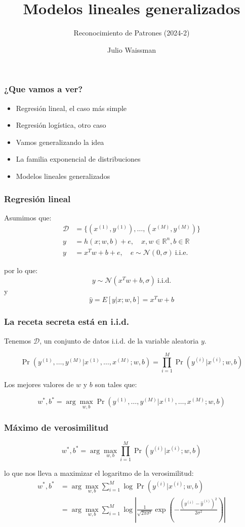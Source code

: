\documentclass{beamer}
\title{Modelos lineales generalizados}
\author{Reconocimiento de Patrones (2024-2)}
\date{Julio Waissman}
\begin{document}
\begin{frame}
  \titlepage
\end{frame}

\begin{frame}
  \frametitle{¿Que vamos a ver?}
  
\begin{itemize}
    \item  Regresión lineal, el caso más simple
    \item  Regresión logística, otro caso
    \item  Vamos generalizando la idea
    \item  La familia exponencial de distribuciones
    \item  Modelos lineales generalizados
\end{itemize}

\end{frame}

\begin{frame}
  \frametitle{Regresión lineal}

  Asumimos que:
  \begin{align*}
    \mathcal{D} &= \{(x^{(1)}, y^{(1)}), \ldots, (x^{(M)}, y^{(M)})\} \\
    y &= h(x; w, b) + e, \quad x, w \in \mathbb{R}^n, b \in  \mathbb{R} \\
    y &= x^T w + b + e, \quad e \sim \mathcal{N}(0, \sigma) \ \text{i.i.e.} 
    \end{align*}

    por lo que:
    $$
    y \sim \mathcal{N}(x^T w + b, \sigma) \ \text{i.i.d.}
    $$
    y 
    $$
    \hat{y} = E[y | x; w, b] = x^T w + b
    $$
\end{frame}

\begin{frame}
  \frametitle{La receta secreta está en i.i.d.}

  Tenemos $\mathcal{D}$, un conjunto de datos i.i.d. de la variable aleatoria $y$.

  $$
  \Pr(y^{(1)}, \ldots, y^{(M)} | x^{(1)}, \ldots, x^{(M)}; w, b) = \prod_{i=1}^M \Pr(y^{(i)} | x^{(i)}; w, b)
  $$

  Los mejores valores de $w$ y $b$ son tales que:

  $$
  w^*, b^* = \arg \max_{w, b} \Pr(y^{(1)}, \ldots, y^{(M)} | x^{(1)}, \ldots, x^{(M)}; w, b)
  $$

\end{frame}

\begin{frame}
  \frametitle{Máximo de verosimilitud}
  $$
  w^*, b^* = \arg \max_{w, b} \prod_{i=1}^M \Pr(y^{(i)} | x^{(i)}; w, b)
  $$

  lo que nos lleva a maximizar el logaritmo de la verosimilitud:
  \begin{align*}
    w^*, b^* &= \arg \max_{w, b} \sum_{i=1}^M \log \Pr(y^{(i)} | x^{(i)}; w, b) \\
    &= \arg \max_{w, b} \sum_{i=1}^M \log\left| \frac{1}{\sqrt{2 \pi \sigma^2}} \exp \left( - \frac{(y^{(i)} - \hat{y}^{(i)})^2}{2 \sigma^2} \right)\right|
  \end{align*}
\end{frame}
\end{document}
